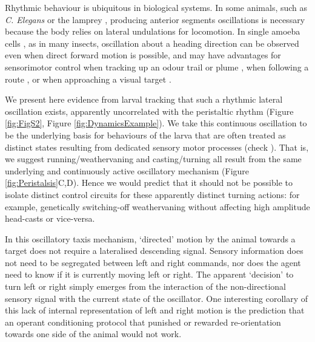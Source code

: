 \documentclass[11pt,a4paper]{article}
\begin{document}
 Rhythmic behaviour is ubiquitous in biological systems. In some animals, such as {\it C. Elegans} \citep{iino2009parallel,izquierdo2010evolution,lockery2011computational}  or the lamprey  \citep{lansner1997realistic,wilson1999spikes}, producing anterior segments oscillations is necessary because the body relies on lateral undulations for locomotion.
 In single amoeba cells \citep{yangzigzag2011}, as in many insects, oscillation about a heading direction can be observed even when direct forward motion is possible, and may have advantages for sensorimotor control when tracking up an odour trail  \citep{hangartner1967german,farkas1972chemical} or plume \citep{budick2006free,belanger1996centrally,willis1997centrally,willis2008effects,carde2008navigational}  , when following a route \citep{lent2010image,kodzhabashev2015route}, or when approaching a visual target \citep{wallace1962experiments,philippides2013bumblebee,voss1998active}.

 We present here evidence from larval tracking that such a rhythmic lateral oscillation exists, apparently uncorrelated with the peristaltic rhythm (Figure \ref{fig:FigS2}, Figure \ref{fig:DynamicsExample}).
We take this continuous oscillation to be the underlying basis for behaviours of the larva that are often treated as distinct states resulting from dedicated sensory motor processes (check \cite{vogelstein2014discovery, green1983organization, cobbwhatandhow1999, gomez2012active, gomez2014multilevel, hernandez2015reverse,gepner2015computations}).
 That is, we suggest running/weathervaning and casting/turning all result from the same underlying and continuously active oscillatory mechanism (Figure \ref{fig:Peristalsis}C,D).
  Hence we would predict that it should not be possible to isolate distinct control circuits for these apparently distinct turning actions: for example, genetically switching-off weathervaning without affecting high amplitude head-casts or vice-versa.

In this oscillatory taxis mechanism, ‘directed’ motion by the animal towards a target does not require a lateralised descending signal. Sensory information does not need to be segregated between left and right commands, nor does the agent need to know if it is currently moving left or right. The apparent ‘decision’ to turn left or right simply emerges from the interaction of the non-directional sensory signal with the current state of the oscillator. 
One interesting corollary of this lack of internal representation of left and right motion is the prediction that an operant conditioning protocol that punished or rewarded re-orientation towards one side of the animal would not work.
\end{document}
